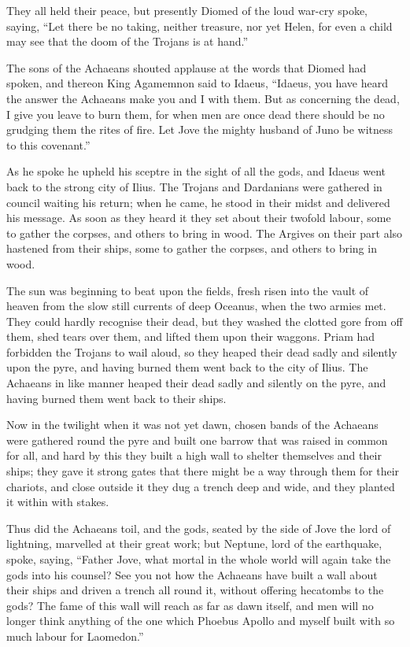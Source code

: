 They all held their peace, but presently Diomed of the loud war-cry spoke,
saying, “Let there be no taking, neither treasure, nor yet Helen, for even
a child may see that the doom of the Trojans is at hand.”

The sons of the Achaeans shouted applause at the words that Diomed had
spoken, and thereon King Agamemnon said to Idaeus, “Idaeus, you have heard
the answer the Achaeans make you and I with them. But as concerning the
dead, I give you leave to burn them, for when men are once dead there
should be no grudging them the rites of fire. Let Jove the mighty husband
of Juno be witness to this covenant.”

As he spoke he upheld his sceptre in the sight of all the gods, and Idaeus
went back to the strong city of Ilius. The Trojans and Dardanians were
gathered in council waiting his return; when he came, he stood in their
midst and delivered his message. As soon as they heard it they set about
their twofold labour, some to gather the corpses, and others to bring in
wood. The Argives on their part also hastened from their ships, some to
gather the corpses, and others to bring in wood.

The sun was beginning to beat upon the fields, fresh risen into the vault
of heaven from the slow still currents of deep Oceanus, when the two
armies met. They could hardly recognise their dead, but they washed the
clotted gore from off them, shed tears over them, and lifted them upon
their waggons. Priam had forbidden the Trojans to wail aloud, so they
heaped their dead sadly and silently upon the pyre, and having burned them
went back to the city of Ilius. The Achaeans in like manner heaped their
dead sadly and silently on the pyre, and having burned them went back to
their ships.

Now in the twilight when it was not yet dawn, chosen bands of the Achaeans
were gathered round the pyre and built one barrow that was raised in
common for all, and hard by this they built a high wall to shelter
themselves and their ships; they gave it strong gates that there might be
a way through them for their chariots, and close outside it they dug a
trench deep and wide, and they planted it within with stakes.

Thus did the Achaeans toil, and the gods, seated by the side of Jove the
lord of lightning, marvelled at their great work; but Neptune, lord of the
earthquake, spoke, saying, “Father Jove, what mortal in the whole world
will again take the gods into his counsel? See you not how the Achaeans
have built a wall about their ships and driven a trench all round it,
without offering hecatombs to the gods? The fame of this wall will reach
as far as dawn itself, and men will no longer think anything of the one
which Phoebus Apollo and myself built with so much labour for Laomedon.”

